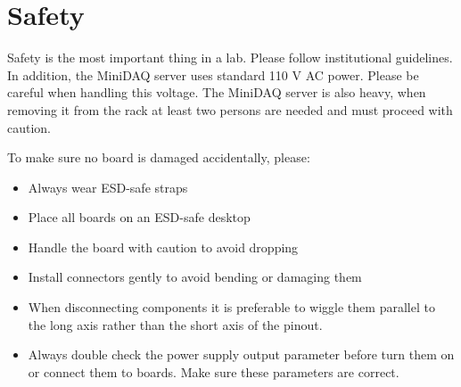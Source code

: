 \section{Safety}
Safety is the most important thing in a lab. Please follow institutional guidelines.
In addition, the MiniDAQ server uses standard 110 V AC power. Please be careful
when handling this voltage.
The MiniDAQ server is also heavy, when removing it from the rack at least two
persons are needed and must proceed with caution.

To make sure no board is damaged accidentally, please:
\begin{itemize}
    \item Always wear ESD-safe straps
    \item Place all boards on an ESD-safe desktop
    \item Handle the board with caution to avoid dropping
    \item Install connectors gently to avoid bending or damaging them
    \item When disconnecting components it is preferable to wiggle them parallel
        to the long axis rather than the short axis of the pinout.
    \item Always double check the power supply output parameter before turn them
        on or connect them to boards. Make sure these parameters are correct.
\end{itemize}

